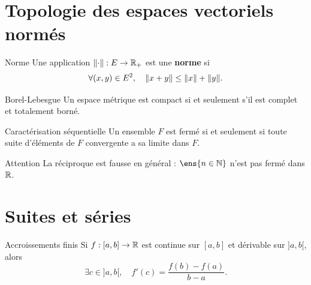 \documentclass{article}
\begin{document}
\section{Topologie des espaces vectoriels normés}

\begin{definition}{Norme}{}
Une application $\lVert \cdot \rVert : E \to \mathbb{R}_+$ est une \textbf{norme} si
\[
\forall (x,y) \in E^2, \quad \lVert x+y \rVert \leq \lVert x \rVert + \lVert y \rVert.
\]
\end{definition}

\begin{theoreme}{Borel-Lebesgue}{}
Un espace métrique est compact si et seulement s'il est complet et totalement borné.
\end{theoreme}

\begin{proposition}{Caractérisation séquentielle}{}
Un ensemble $F$ est fermé si et seulement si toute suite d'éléments de $F$ convergente
a sa limite dans $F$.
\end{proposition}

\begin{remarque}{Attention}{}
La réciproque est fausse en général : $\ens{n \in \N}$ n'est pas fermé dans $\mathbb{R}$.
\end{remarque}

\section{Suites et séries}

\begin{theoreme}{Accroissements finis}{}
Si $f : [a,b] \to \mathbb{R}$ est continue sur $[a,b]$ et dérivable sur $]a,b[$, alors
\[
\exists c \in ]a,b[, \quad f'(c) = \frac{f(b)-f(a)}{b-a}.
\]
\end{theoreme}
\end{document}
